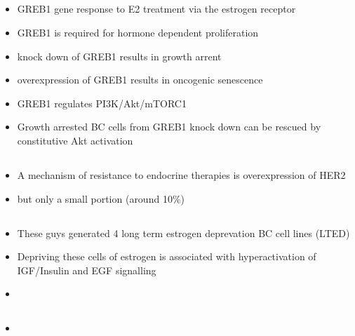 \documentclass{article}
\begin{document}
    \subsection{\cite{hains2019greb1}}
    \begin{itemize}
        \item GREB1 gene response to E2 treatment via the estrogen receptor
        \item GREB1 is required for hormone dependent proliferation
        \item knock down of GREB1 results in growth arrent
        \item overexpression of GREB1 results in oncogenic senescence
        \item GREB1 regulates PI3K/Akt/mTORC1
        \item Growth arrested BC cells from GREB1 knock down can be rescued by constitutive Akt activation
    \end{itemize}

    \subsection{\cite{miller2010hyperactivity}}
    \begin{itemize}
        \item A mechanism of resistance to endocrine therapies is overexpression of HER2
        \item but only a small portion (around 10\%)
    \end{itemize}

    \subsection{\cite{miller2010hyperactivity}}
    \begin{itemize}
        \item These guys generated 4 long term estrogen deprevation BC cell lines (LTED)
        \item Depriving these cells of estrogen is associated with hyperactivation of IGF/Insulin and EGF signalling
        \item
    \end{itemize}

    \subsection{\cite{miller2011phosphatidylinositol}}
    \begin{itemize}
        \item
    \end{itemize}
\end{document}
